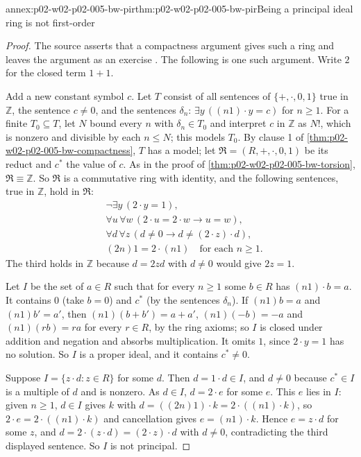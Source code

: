 \begin{annexitem}{annex:p02-w02-p02-005-bw-pir}{thm:p02-w02-p02-005-bw-pir}{Being a principal ideal ring is not first-order}
\begin{proof}
The source asserts that a compactness argument gives such a ring and leaves
the argument as an exercise \cite[ch.~A.1, \S2, p.~14]{Barwise1977FirstOrder}.
The following is one such argument.  Write \(2\) for the closed term
\(1+1\).

Add a new constant symbol \(c\).  Let \(T\) consist of all sentences of
\(\{+,\cdot,0,1\}\) true in \(\mathbb Z\), the sentence \(c\neq0\), and the
sentences \(\delta_n\): \(\exists y\,((n1)\cdot y=c)\) for \(n\geq1\).  For
a finite \(T_0\subseteq T\), let \(N\) bound every \(n\) with
\(\delta_n\in T_0\) and interpret \(c\) in \(\mathbb Z\) as \(N!\), which
is nonzero and divisible by each \(n\leq N\); this models \(T_0\).  By
clause 1 of \cref{thm:p02-w02-p02-005-bw-compactness}, \(T\) has a model;
let \(\mathfrak R=(R,+,\cdot,0,1)\) be its reduct and \(c^*\) the value of
\(c\).  As in the proof of \cref{thm:p02-w02-p02-005-bw-torsion},
\(\mathfrak R\equiv\mathbb Z\).  So \(\mathfrak R\) is a commutative ring
with identity, and the following sentences, true in \(\mathbb Z\), hold in
\(\mathfrak R\):
\[
\begin{aligned}
&\neg\exists y\,(2\cdot y=1),\\
&\forall u\,\forall w\,(2\cdot u=2\cdot w\to u=w),\\
&\forall d\,\forall z\,(d\neq0\to d\neq(2\cdot z)\cdot d),\\
&(2n)1=2\cdot(n1)\quad\text{for each }n\geq1.
\end{aligned}
\]
The third holds in \(\mathbb Z\) because \(d=2zd\) with \(d\neq0\) would
give \(2z=1\).

Let \(I\) be the set of \(a\in R\) such that for every \(n\geq1\) some
\(b\in R\) has \((n1)\cdot b=a\).  It contains \(0\) (take \(b=0\)) and
\(c^*\) (by the sentences \(\delta_n\)).  If \((n1)b=a\) and
\((n1)b'=a'\), then \((n1)(b+b')=a+a'\), \((n1)(-b)=-a\) and
\((n1)(rb)=ra\) for every \(r\in R\), by the ring axioms; so \(I\) is
closed under addition and negation and absorbs multiplication.  It omits
\(1\), since \(2\cdot y=1\) has no solution.  So \(I\) is a proper ideal,
and it contains \(c^*\neq0\).

Suppose \(I=\{z\cdot d:z\in R\}\) for some \(d\).  Then \(d=1\cdot d\in
I\), and \(d\neq0\) because \(c^*\in I\) is a multiple of \(d\) and is
nonzero.  As \(d\in I\), \(d=2\cdot e\) for some \(e\).  This \(e\) lies
in \(I\): given \(n\geq1\), \(d\in I\) gives \(k\) with
\(d=((2n)1)\cdot k=2\cdot((n1)\cdot k)\), so \(2\cdot e=2\cdot((n1)\cdot
k)\) and cancellation gives \(e=(n1)\cdot k\).  Hence \(e=z\cdot d\) for
some \(z\), and \(d=2\cdot(z\cdot d)=(2\cdot z)\cdot d\) with \(d\neq0\),
contradicting the third displayed sentence.  So \(I\) is not principal.


\end{proof}
\end{annexitem}
